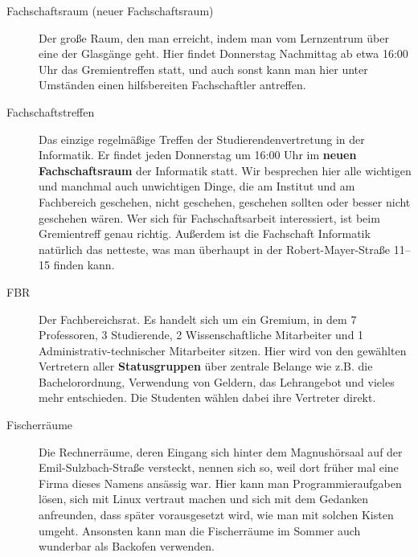 \begin{description}
\item[Fachschaftsraum (neuer Fachschaftsraum)]  Der große Raum, den
man erreicht, indem man vom Lernzentrum über eine der Glasgänge geht. 
Hier findet Donnerstag Nachmittag ab etwa 16:00 Uhr das
Gremientreffen statt, und auch sonst kann man hier unter Umständen
einen hilfsbereiten Fachschaftler antreffen. 


\item[Fachschaftstreffen] Das einzige regelmäßige Treffen der
Studierendenvertretung in der Informatik. Er findet jeden Donnerstag
um 16:00 Uhr im \textbf{neuen Fachschaftsraum} der Informatik statt.
Wir besprechen hier alle wichtigen und manchmal auch unwichtigen
Dinge, die am Institut und am Fachbereich geschehen, nicht geschehen,
geschehen sollten oder besser nicht geschehen wären. Wer sich für
Fachschaftsarbeit interessiert, ist beim Gremientreff genau richtig.
Außerdem ist die Fachschaft Informatik natürlich das netteste, was man
überhaupt in der Robert-Mayer-Straße 11–15 finden kann.




\item[FBR] Der Fachbereichsrat. Es handelt sich um ein Gremium, in dem
7 Professoren, 3 Studierende, 2 Wissenschaftliche Mitarbeiter und 1
Administrativ-technischer Mitarbeiter sitzen. Hier wird von den
gewählten Vertretern aller \textbf{Statusgruppen} über zentrale
Belange wie z.B. die Bachelorordnung, Verwendung von Geldern, das
Lehrangebot und vieles mehr entschieden. Die Studenten wählen dabei ihre Vertreter direkt.


\item[Fischerräume] Die Rechnerräume, deren Eingang sich hinter dem
Magnushörsaal auf der Emil-Sulzbach-Straße versteckt, nennen sich so,
weil dort früher mal eine Firma dieses Namens ansässig war. Hier kann
man Programmieraufgaben lösen, sich mit Linux vertraut machen und sich
mit dem Gedanken anfreunden, dass später vorausgesetzt wird, wie man
mit solchen Kisten umgeht. Ansonsten kann man die Fischerräume im
Sommer auch wunderbar als Backofen verwenden.



\end{description}
